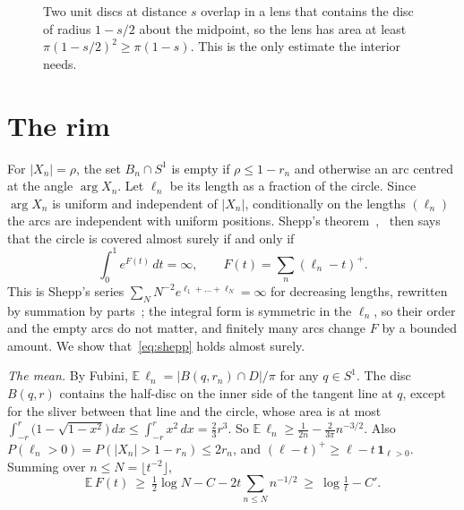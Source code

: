 \documentclass[11pt]{amsart}
\theoremstyle{remark}
\begin{document}
\begin{figure}[ht]
\centering
{}
\caption{Two unit discs at distance $s$ overlap in a lens that contains the disc of radius $1-s/2$ about the midpoint, so the lens has area at least $\pi(1-s/2)^2\ge\pi(1-s)$. This is the only estimate the interior needs.}
\label{fig:lens}
\end{figure}

\section{The rim}\label{sec:rim}

For $|X_n|=\rho$, the set $B_n\cap S^1$ is empty if $\rho\le1-r_n$ and otherwise an arc centred at the angle $\arg X_n$. Let $\ell_n$ be its length as a fraction of the circle. Since $\arg X_n$ is uniform and independent of $|X_n|$, conditionally on the lengths $(\ell_n)$ the arcs are independent with uniform positions. Shepp's theorem~\cite{S},~\cite[Ch.~11]{K} then says that the circle is covered almost surely if and only if
\begin{equation}\label{eq:shepp}
\int_0^1e^{F(t)}\,dt=\infty,\qquad F(t)=\sum_n(\ell_n-t)^+ .
\end{equation}
This is Shepp's series $\sum_NN^{-2}e^{\ell_1+\dots+\ell_N}=\infty$ for decreasing lengths, rewritten by summation by parts~\cite[\S2, eq.~(3)]{Z}; the integral form is symmetric in the $\ell_n$, so their order and the empty arcs do not matter, and finitely many arcs change $F$ by a bounded amount. We show that~\eqref{eq:shepp} holds almost surely.

\emph{The mean.} By Fubini, $\mathbb E\,\ell_n=|B(q,r_n)\cap D|/\pi$ for any $q\in S^1$. The disc $B(q,r)$ contains the half-disc on the inner side of the tangent line at $q$, except for the sliver between that line and the circle, whose area is at most $\int_{-r}^r\bigl(1-\sqrt{1-x^2}\bigr)\,dx\le\int_{-r}^rx^2\,dx=\frac23r^3$. So $\mathbb E\,\ell_n\ge\frac1{2n}-\frac2{3\pi}n^{-3/2}$. Also $P(\ell_n>0)=P(|X_n|>1-r_n)\le2r_n$, and $(\ell-t)^+\ge\ell-t\,\mathbf 1_{\ell>0}$. Summing over $n\le N=\lfloor t^{-2}\rfloor$,
\[
\mathbb E\,F(t)\ \ge\ \tfrac12\log N-C-2t\sum_{n\le N}n^{-1/2}\ \ge\ \log\tfrac1t-C' .
\]
\end{document}
